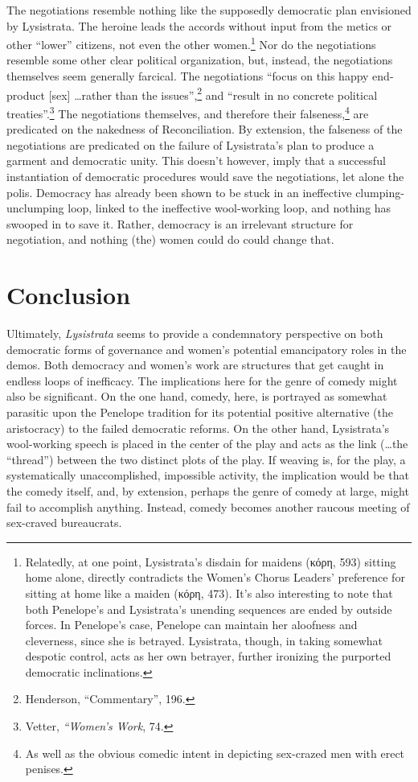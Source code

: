 \documentclass[12pt]{article}
\begin{document}
The negotiations resemble nothing like the supposedly democratic plan envisioned by Lysistrata. The heroine leads the accords without input from the metics or other ``lower'' citizens, not even the other women.\footnote{Relatedly, at one point, Lysistrata's disdain for maidens (κόρη, 593) sitting home alone, directly contradicts the Women's Chorus Leaders' preference for sitting at home like a maiden (κόρη, 473). It's also interesting to note that both Penelope's and Lysistrata's unending sequences are ended by outside forces. In Penelope's case, Penelope can maintain her aloofness and cleverness, since she is betrayed. Lysistrata, though, in taking somewhat despotic control, acts as her own betrayer, further ironizing the purported democratic inclinations.} Nor do the negotiations resemble some other clear political organization, but, instead, the negotiations themselves seem generally farcical. The negotiations ``focus on this happy end-product [sex] \dots  rather than the issues'',\footnote{Henderson, ``Commentary'', 196.} and ``result in no concrete political treaties''.\footnote{Vetter, \textit{``Women's Work}, 74.} The negotiations themselves, and therefore their falseness,\footnote{As well as the obvious comedic intent in depicting sex-crazed men with erect penises.} are predicated on the nakedness of Reconciliation. By extension, the falseness of the negotiations are predicated on the failure of Lysistrata's plan to produce a garment and democratic unity. This doesn't however, imply that a successful instantiation of democratic procedures would save the negotiations, let alone the polis. Democracy has already been shown to be stuck in an ineffective clumping-unclumping loop, linked to the ineffective wool-working loop, and nothing has swooped in to save it. Rather, democracy is an irrelevant structure for negotiation, and nothing (the) women could do could change that.

\section{Conclusion}

Ultimately, \textit{Lysistrata} seems to provide a condemnatory perspective on both democratic forms of governance and women's potential emancipatory roles in the demos. Both democracy and women's work are structures that get caught in endless loops of inefficacy. The implications here for the genre of comedy might also be significant. On the one hand, comedy, here, is portrayed as somewhat parasitic upon the Penelope tradition for its potential positive alternative (the aristocracy) to the failed democratic reforms. On the other hand, Lysistrata's wool-working speech is placed in the center of the play and acts as the link (\dots  the ``thread'') between the two distinct plots of the play. If weaving is, for the play, a systematically unaccomplished, impossible activity, the implication would be that the comedy itself, and, by extension, perhaps the genre of comedy at large, might fail to accomplish anything. Instead, comedy becomes another raucous meeting of sex-craved bureaucrats.
\end{document}
